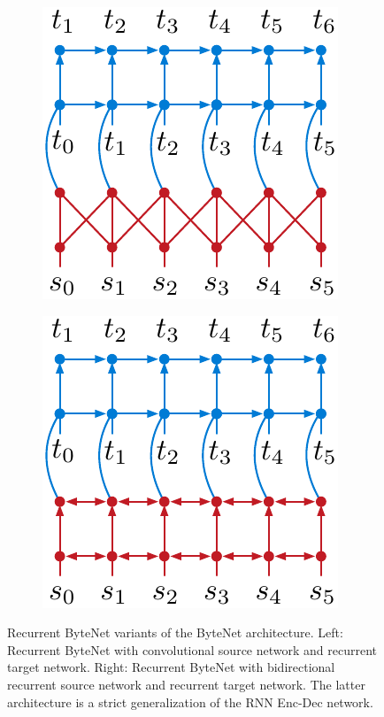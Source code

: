 \documentclass{article}
\begin{document}
\begin{figure}[t]
\centering
\hspace{-1cm}
\begin{subfigure}{}
    \includegraphics[scale=0.5]{BytenetCR}
    \label{fig:mt_decoder_block}
\end{subfigure}
\hspace{1cm}
\begin{subfigure}{}
    \includegraphics[scale=0.5]{BytenetRR}
    \label{fig:lm_decoder_block}
\end{subfigure}
\hspace{-1cm}
\caption{Recurrent ByteNet variants of the ByteNet architecture. Left: Recurrent ByteNet with convolutional source network and recurrent target network. Right: Recurrent ByteNet with bidirectional recurrent source network and recurrent target network. The latter architecture is a strict generalization of the RNN Enc-Dec network. }
\label{recurrentBytenet}
\end{figure}
\end{document}
